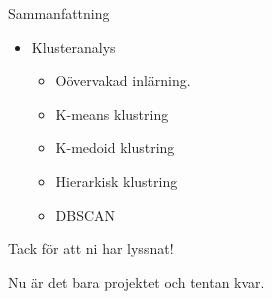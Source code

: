\documentclass[10pt,english]{beamer}
\begin{document}
\begin{frame}{Sammanfattning}
    
    \begin{itemize}
        \item Klusteranalys
        \begin{itemize}
            \item Oövervakad inlärning.
            \item K-means klustring
            \item K-medoid klustring
            \item Hierarkisk klustring
            \item DBSCAN
        \end{itemize}
    \end{itemize}

\end{frame}



\begin{frame}[standout]
    \LARGE Tack för att ni har lyssnat!

    \large Nu är det bara projektet och tentan kvar.
\end{frame}
\end{document}
